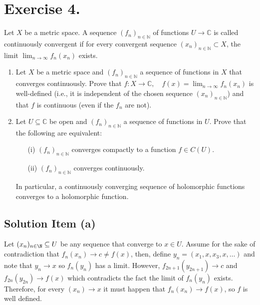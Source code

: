 
\section*{Exercise 4.}

Let $\mathit{X}$ be a metric space. A sequence $(f_{n})_{n \in \mathbb{N}}$ of functions $U \to \mathbb{C}$ is called continuously convergent if for every convergent sequence $(x_{n})_{n \in \mathbb{N}} \subset X$, the limit $\lim_{n \to \infty} f_{n}(x_{n})$ exists.


\begin{enumerate}[label=(\alph*)]
    \item Let $X$ be a metric space and $(f_{n})_{n \in \mathbb{N}}$ a sequence of functions in $X$ that converges continuously. Prove that $f : X \to \mathbb{C}, \quad f(x) = \lim_{n \to \infty} f_{n}(x_{n})$ is well-defined (i.e., it is independent of the chosen sequence $(x_{n})_{n \in \mathbb{N}}$) and that $f$ is continuous (even if the $f_{n}$ are not).
    \item Let $U \subseteq \mathbb{C}$ be open and $(f_{n})_{n \in \mathbb{N}}$ a sequence of functions in $\mathit{U}$. Prove that the following are equivalent:
    \begin{itemize}
        \item[(i)] $(f_{n})_{n \in \mathbb{N}}$ converges compactly to a function $f \in C(U)$.
        \item[(ii)] $(f_{n})_{n \in \mathbb{N}}$ converges continuously.
    \end{itemize}
    In particular, a continuously converging sequence of holomorphic functions converges to a holomorphic function.
\end{enumerate}

\subsection*{Solution Item (a)}

Let $(x_n)_{n\in \N} \subseteq U$ be any sequence that converge to $x \in U$. Assume for the sake of contradiction that $f_n(x_n) \to c \neq f(x)$, then, define $y_n = (x_1,x,x_3,x,\ldots)$ and note that $y_n \to x$ so $f_n(y_n)$ has a limit. However, $f_{2n+1}(y_{2n+1}) \to c$ and $f_{2n}(y_{2n}) \to f(x)$ which contradicts the fact the limit of $f_n(y_n)$ exists. Therefore, for every $(x_n) \to x$ it must happen that $f_n(x_n) \to f(x)$, so $f$ is well defined.


